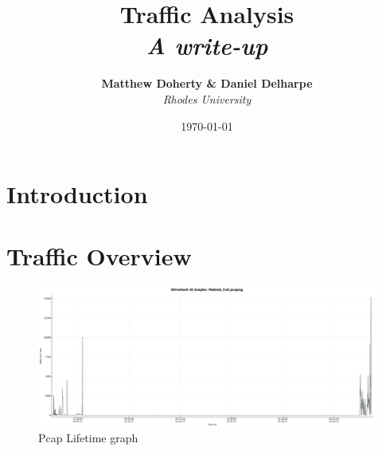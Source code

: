 \documentclass[11pt]{diazessay} %
\title{\textbf{Traffic Analysis} \\ {\Large\itshape A write-up}} %
\author{\textbf{Matthew Doherty \& Daniel Delharpe} \\ \textit{Rhodes University}} %
\date{\today} %
\begin{document}
\maketitle %



\renewcommand{\thesection}{\arabic{section}}
\renewcommand{\thesubsection}{\arabic{subsection}}
\renewcommand{\thesubsubsection}{\arabic{subsubsection}}
\renewcommand{\thesubsection}{\thesection.\arabic{subsection}}
\renewcommand{\thesubsubsection}{\thesubsection.\arabic{subsubsection}}

\vspace{30pt} %



\section{Introduction}




\section{Traffic Overview}

\begin{figure}[H]
        \centering
        \includegraphics[scale=0.30]{Maktub_Full.png}
    \caption{Pcap Lifetime graph}
\end{figure}
\end{document}

